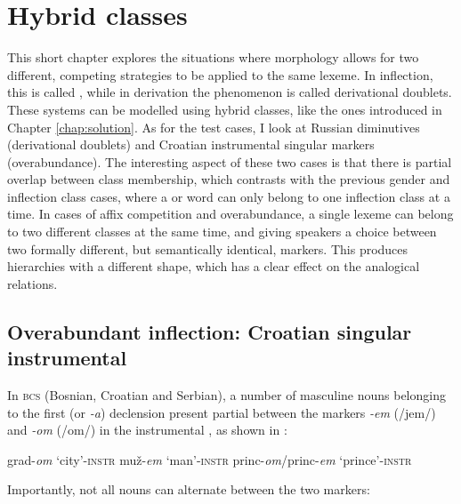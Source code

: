 \chapter{Hybrid classes}\label{chap:hybrid}

This short chapter explores the situations where morphology allows for two different, competing strategies to be applied to the same lexeme. In inflection, this is called , while in derivation the phenomenon is called derivational  doublets. These systems can be modelled using hybrid classes, like the ones introduced in Chapter \ref{chap:solution}. As for the test cases, I look at Russian diminutives (derivational doublets) and Croatian instrumental singular markers (overabundance). The interesting aspect of these two cases is that there is partial overlap between class membership, which contrasts with the previous gender and inflection class cases, where a  or word can only belong to one inflection class at a time. In cases of affix competition and overabundance, a single lexeme can belong to two different classes at the same time, and giving speakers a choice between two formally different, but semantically identical, markers. This produces hierarchies with a different shape, which has a clear effect on the analogical relations.

\section{Overabundant inflection: Croatian singular instrumental}


In \textsc{bcs} (Bosnian, Croatian and Serbian), a number of masculine nouns belonging to the first (or \textit{-a}) declension present partial  between the markers \textit{-em} (/jem/) and \textit{-om} (/om/) in the instrumental , as shown in :

\begin{exe}
    \ex \label{exe-over-croat}
    \begin{xlist}
        \ex grad-\textit{om} `city'-\textsc{instr}
        \ex muž-\textit{em} `man'-\textsc{instr}
        \ex princ-\textit{om}/princ-\textit{em} `prince'-\textsc{instr}
    \end{xlist}
\end{exe}

Importantly, not all nouns can alternate between the two markers:

